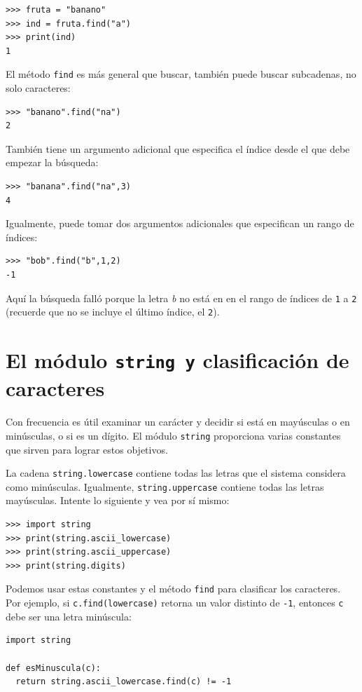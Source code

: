 \begin{verbatim}
>>> fruta = "banano"
>>> ind = fruta.find("a")
>>> print(ind)
1
\end{verbatim}

El método \texttt{find} es más general que buscar, también puede buscar
subcadenas, no solo caracteres:
\begin{verbatim}
>>> "banano".find("na")
2
\end{verbatim}

También tiene un argumento adicional que especifica el índice desde
el que debe empezar la búsqueda:
\begin{verbatim}
>>> "banana".find("na",3) 
4
\end{verbatim}

Igualmente, puede tomar dos argumentos adicionales que especifican
un rango de índices:
\begin{verbatim}
>>> "bob".find("b",1,2) 
-1
\end{verbatim}

Aquí la búsqueda falló porque la letra {\em b} no está en en el
rango de índices de \texttt{1} a \texttt{2} (recuerde que no se incluye
el último índice, el \texttt{2}).

\section{El módulo \texttt{string y} clasificación de caracteres}

 

\label{in}  
  

Con frecuencia es útil examinar un carácter y decidir si está en mayúsculas
o en minúsculas, o si es un dígito. El módulo \texttt{string} proporciona
varias constantes que sirven para lograr estos objetivos.

La cadena \texttt{string.lowercase} contiene todas las letras que
el sistema considera como minúsculas. Igualmente, \texttt{string.uppercase}
contiene todas las letras mayúsculas. Intente lo siguiente y vea por
sí mismo:
\begin{verbatim}
>>> import string
>>> print(string.ascii_lowercase)
>>> print(string.ascii_uppercase)
>>> print(string.digits)
\end{verbatim}
Podemos usar estas constantes y el método \texttt{find} para clasificar
los caracteres. Por ejemplo, si \texttt{c.find(lowercase)} retorna
un valor distinto de \texttt{-1}, entonces \texttt{c} debe ser una
letra minúscula:
\begin{verbatim}
import string

def esMinuscula(c):
  return string.ascii_lowercase.find(c) != -1
\end{verbatim}


